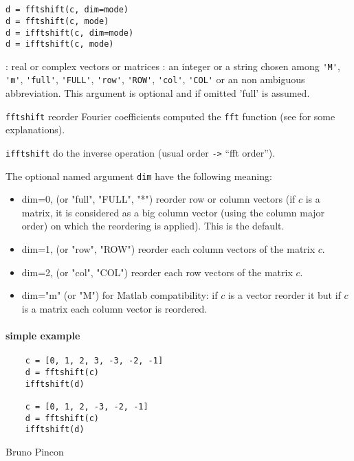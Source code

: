 
\begin{mandesc}
  \\
  \\
\end{mandesc}

\begin{calling_sequence}
\begin{verbatim}
d = fftshift(c, dim=mode)
d = fftshift(c, mode)
d = ifftshift(c, dim=mode)
d = ifftshift(c, mode)
\end{verbatim}
\end{calling_sequence}
\begin{parameters}
  \begin{varlist}
    : real or complex vectors or matrices
    : an integer or a string chosen among \verb+'M'+, \verb+'m'+, \verb+'full'+, \verb+'FULL'+, \verb+'row'+,
    \verb+'ROW'+, \verb+'col'+, \verb+'COL'+ or an non ambiguous abbreviation. 
    This argument is optional and if omitted 'full' is assumed.
  \end{varlist}
\end{parameters}

\begin{mandescription}

\verb+fftshift+ reorder Fourier coefficients computed the \verb+fft+ function (see 
for some explanations).

\verb+ifftshift+ do the inverse operation (usual order \verb+->+ ``fft order'').

The optional named argument \verb+dim+ have the following meaning:
\begin{itemize}
\item dim=0, (or "full", "FULL", "*") reorder row or column vectors (if $c$ is a 
matrix, it is considered as a big column vector (using the column major order) on which 
the reordering is applied). This is the default.
\item dim=1, (or "row", "ROW") reorder each column vectors of the matrix $c$.
\item dim=2, (or "col", "COL") reorder each row vectors of the matrix $c$.
\item dim="m" (or "M") for Matlab compatibility: if $c$ is a vector reorder it but if
$c$ is a matrix each column vector is reordered.
\end{itemize}

\end{mandescription}
 
\begin{examples}
 \paragraph{simple example}
  \begin{Verbatim}
    c = [0, 1, 2, 3, -3, -2, -1]
    d = fftshift(c)
    ifftshift(d)

    c = [0, 1, 2, -3, -2, -1]
    d = fftshift(c)
    ifftshift(d)
  \end{Verbatim}
\end{examples}

\begin{authors}
   Bruno Pincon
\end{authors}

